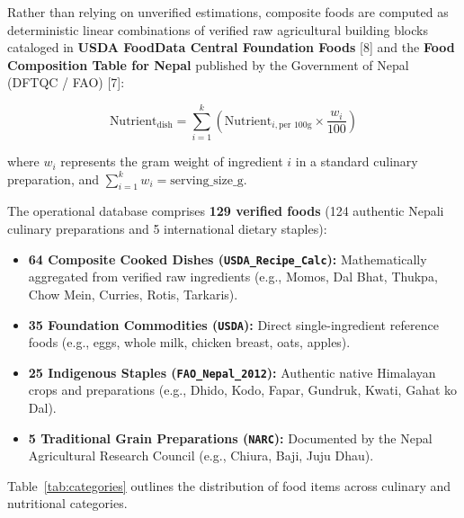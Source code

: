 \documentclass[12pt,a4paper]{report}
\begin{document}
Rather than relying on unverified estimations, composite foods are computed as deterministic linear combinations of verified raw agricultural building blocks cataloged in \textbf{USDA FoodData Central Foundation Foods} [8] and the \textbf{Food Composition Table for Nepal} published by the Government of Nepal (DFTQC / FAO) [7]:

\begin{equation}
\text{Nutrient}_{\text{dish}} = \sum_{i=1}^{k} \left( \text{Nutrient}_{i,\text{per 100g}} \times \frac{w_i}{100} \right)
\label{eq:recipe_sum}
\end{equation}

where $w_i$ represents the gram weight of ingredient $i$ in a standard culinary preparation, and $\sum_{i=1}^{k} w_i = \text{serving\_size\_g}$. 

The operational database comprises \textbf{129 verified foods} (124 authentic Nepali culinary preparations and 5 international dietary staples):
\begin{itemize}
  \item \textbf{64 Composite Cooked Dishes (\texttt{USDA\_Recipe\_Calc}):} Mathematically aggregated from verified raw ingredients (e.g., Momos, Dal Bhat, Thukpa, Chow Mein, Curries, Rotis, Tarkaris).
  \item \textbf{35 Foundation Commodities (\texttt{USDA}):} Direct single-ingredient reference foods (e.g., eggs, whole milk, chicken breast, oats, apples).
  \item \textbf{25 Indigenous Staples (\texttt{FAO\_Nepal\_2012}):} Authentic native Himalayan crops and preparations (e.g., Dhido, Kodo, Fapar, Gundruk, Kwati, Gahat ko Dal).
  \item \textbf{5 Traditional Grain Preparations (\texttt{NARC}):} Documented by the Nepal Agricultural Research Council (e.g., Chiura, Baji, Juju Dhau).
\end{itemize}

Table~\ref{tab:categories} outlines the distribution of food items across culinary and nutritional categories.
\end{document}
